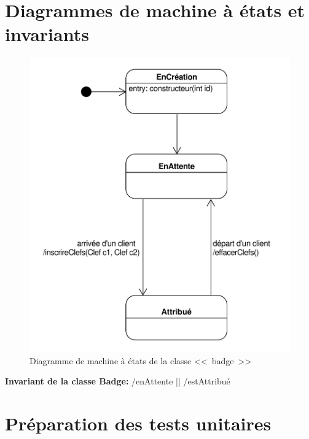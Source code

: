 \documentclass[11pt,article]{article}
\begin{document}
\section{Diagrammes de machine à états et invariants}

\begin{figure}[h!]
\begin{center}
\includegraphics[scale=0.5]{DiagrammesDeMachineAEtats/gestionclefshotel_uml_diag_machine_a_etats_badge}
\caption{Diagramme de machine à états de la classe <<~badge~>>}
\end{center}
\label{umlet_diag_classes}
\end{figure}

\textbf{Invariant de la classe Badge:} /enAttente || /estAttribué

\newpage

\section{Préparation des tests unitaires}
\end{document}
